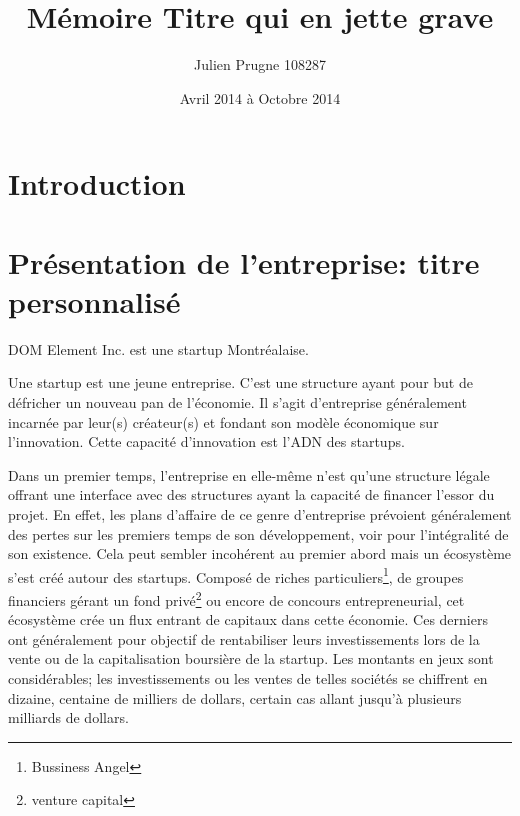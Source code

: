 \documentclass[11pt, a4paper ]{article}
\title{Mémoire Titre qui en jette grave}
\author{Julien Prugne 108287}
\date{Avril 2014 à Octobre 2014}
\let\stdsection\section
\renewcommand\section{\newpage\stdsection}
\begin{document}
	\maketitle
	\tableofcontents

\begin{spacing}{1.5}
	\section{Introduction} %



	\section{Présentation de l'entreprise: titre personnalisé} %

DOM Element Inc. est une startup Montréalaise.

Une startup\cite{theseStartup} est une jeune entreprise. C'est une structure ayant pour but de défricher un nouveau pan de l'économie. Il s'agit d'entreprise généralement incarnée par leur(s) créateur(s) et fondant son modèle économique sur l'innovation. Cette capacité d'innovation est l'ADN des startups.

Dans un premier temps, l'entreprise en elle-même n'est qu'une structure légale offrant une interface avec des structures ayant la capacité de financer l’essor du projet. En effet, les plans d'affaire de ce genre d'entreprise prévoient généralement des pertes sur les premiers temps de son développement, voir pour l'intégralité de son existence. Cela peut sembler incohérent au premier abord mais un écosystème s'est créé autour des startups. Composé de riches particuliers\footnote{Bussiness Angel}, de groupes financiers gérant un fond privé\footnote{venture capital} ou encore de concours entrepreneurial, cet écosystème crée un flux entrant de capitaux dans cette économie. Ces derniers ont généralement pour objectif de rentabiliser leurs investissements lors de la vente ou de la capitalisation boursière de la startup. Les montants en jeux sont considérables; les investissements ou les ventes de telles sociétés se chiffrent en dizaine, centaine de milliers de dollars, certain cas allant jusqu'à plusieurs milliards de dollars.


\end{spacing}
\end{document}
